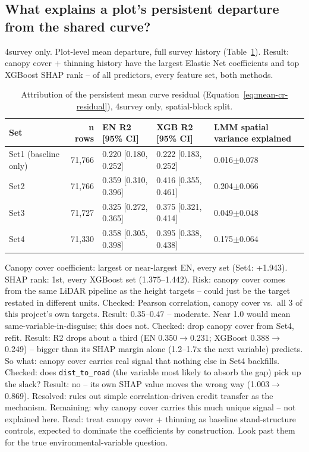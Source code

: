\documentclass[logo,msc,ai]{infthesis}           %
\begin{document}
\subsection{What explains a plot's persistent departure from the shared curve?}
\label{sec:results-rq2b}
\label{sec:results-q1-attribution}

4survey only. Plot-level mean departure, full survey history (Table~\ref{tab:results-rq2b}).
Result: canopy cover + thinning history have the largest Elastic Net coefficients and
top XGBoost SHAP rank -- of all predictors, every feature set, both methods.

\begin{table}[!htbp]
\centering
\scriptsize
\renewcommand{\arraystretch}{1.2}
\begin{tabular}{lrlll}
\toprule
Set & n rows & EN R2 [95\% CI] & XGB R2 [95\% CI] & LMM spatial variance explained \\
\midrule
Set1 (baseline only) & 71{,}766 & 0.220 [0.180, 0.252] & 0.222 [0.183, 0.252] & 0.016$\pm$0.078 \\
Set2 & 71{,}766 & 0.359 [0.310, 0.396] & 0.416 [0.355, 0.461] & 0.204$\pm$0.066 \\
Set3 & 71{,}727 & 0.325 [0.272, 0.365] & 0.375 [0.321, 0.414] & 0.049$\pm$0.048 \\
Set4 & 71{,}330 & 0.358 [0.305, 0.398] & 0.395 [0.338, 0.438] & 0.175$\pm$0.064 \\
\bottomrule
\end{tabular}
\caption{\small{Attribution of the persistent mean curve residual (Equation~\ref{eq:mean-cr-residual}),
4survey only, spatial-block split.}}
\label{tab:results-rq2b}
\end{table}

Canopy cover coefficient: largest or near-largest EN, every set (Set4: +1.943). SHAP
rank: 1st, every XGBoost set (1.375--1.442).
Risk: canopy cover comes from the same LiDAR pipeline as the height targets --
could just be the target restated in different units.
Checked: Pearson correlation, canopy cover vs.\ all 3 of this project's own targets.
Result: 0.35--0.47 -- moderate. Near 1.0 would mean same-variable-in-disguise; this
does not.
Checked: drop canopy cover from Set4, refit. Result: R2 drops about a third (EN
0.350$\to$0.231; XGBoost 0.388$\to$0.249) -- bigger than its SHAP margin alone
(1.2--1.7x the next variable) predicts.
So what: canopy cover carries real signal that nothing else in Set4 backfills.
Checked: does \texttt{dist\_to\_road} (the variable most likely to absorb the gap)
pick up the slack? Result: no -- its own SHAP value moves the wrong way (1.003$\to$
0.869).
Resolved: rules out simple correlation-driven credit transfer as the mechanism.
Remaining: why canopy cover carries this much unique signal -- not explained here.
Read: treat canopy cover + thinning as baseline stand-structure controls, expected
to dominate the coefficients by construction. Look past them for the true
environmental-variable question.
\end{document}

